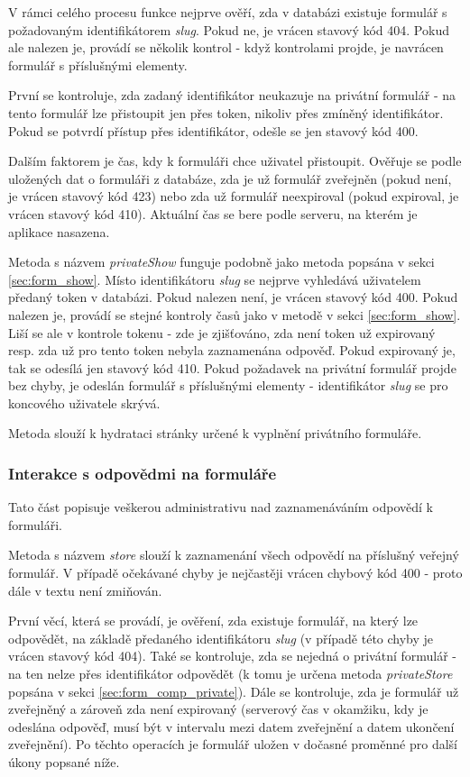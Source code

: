 			V rámci celého procesu funkce nejprve ověří, zda v databázi existuje formulář s požadovaným identifikátorem \textit{slug}. Pokud ne, je vrácen stavový kód 404. Pokud ale nalezen je, provádí se několik kontrol - když kontrolami projde, je navrácen formulář s příslušnými elementy.
			
			První se kontroluje, zda zadaný identifikátor neukazuje na privátní formulář - na tento formulář lze přistoupit jen přes token, nikoliv přes zmíněný identifikátor. Pokud se potvrdí přístup přes identifikátor, odešle se jen stavový kód 400.
			
			Dalším faktorem je čas, kdy k formuláři chce uživatel přistoupit. Ověřuje se podle uložených dat o formuláři z databáze, zda je už formulář zveřejněn (pokud není, je vrácen stavový kód 423) nebo zda už formulář neexpiroval (pokud expiroval, je vrácen stavový kód 410). Aktuální čas se bere podle serveru, na kterém je aplikace nasazena.
			
			\label{sec:form_privateshow}
			Metoda s názvem \textit{privateShow} funguje podobně jako metoda popsána v sekci \ref{sec:form_show}. Místo identifikátoru \textit{slug} se nejprve vyhledává uživatelem předaný token v databázi. Pokud nalezen není, je vrácen stavový kód 400. Pokud nalezen je, provádí se stejné kontroly časů jako v metodě v sekci \ref{sec:form_show}. Liší se ale v kontrole tokenu - zde je zjišťováno, zda není token už expirovaný resp. zda už pro tento token nebyla zaznamenána odpověď. Pokud expirovaný je, tak se odesílá jen stavový kód 410. Pokud požadavek na privátní formulář projde bez chyby, je odeslán formulář s příslušnými elementy - identifikátor \textit{slug} se pro koncového uživatele skrývá.
			
			Metoda slouží k hydrataci stránky určené k vyplnění privátního formuláře.
		\subsubsection{Interakce s odpovědmi na formuláře}
		Tato část popisuje veškerou administrativu nad zaznamenáváním odpovědí k formuláři.
		
			\label{sec:form_comp_public}
			Metoda s názvem \textit{store} slouží k zaznamenání všech odpovědí na příslušný veřejný formulář. V případě očekávané chyby je nejčastěji vrácen chybový kód 400 - proto dále v textu není zmiňován.
			
			První věcí, která se provádí, je ověření, zda existuje formulář, na který lze odpovědět, na základě předaného identifikátoru \textit{slug} (v případě této chyby je vrácen stavový kód 404). Také se kontroluje, zda se nejedná o privátní formulář - na ten nelze přes identifikátor odpovědět (k tomu je určena metoda \textit{privateStore} popsána v sekci \ref{sec:form_comp_private}). Dále se kontroluje, zda je formulář už zveřejněný a zároveň zda není expirovaný (serverový čas v okamžiku, kdy je odeslána odpověď, musí být v intervalu mezi datem zveřejnění a datem ukončení zveřejnění). Po těchto operacích je formulář uložen v dočasné proměnné pro další úkony popsané níže.
			
